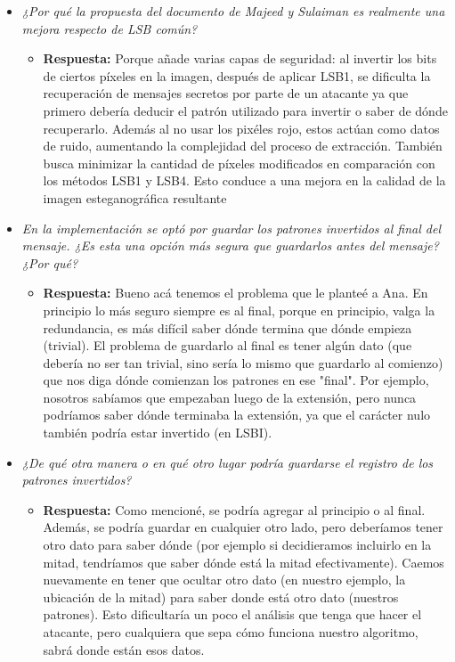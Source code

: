 \documentclass[a4paper,12pt]{article}
\begin{document}
\begin{itemize}
\begin{itemize}
		\end{itemize}
		
		
		\item \textit{¿Por qué la propuesta del documento de Majeed y Sulaiman es realmente una mejora respecto de LSB común?}
		\begin{itemize}
			\item \textbf{Respuesta:} Porque añade varias capas de seguridad: al invertir los bits de ciertos píxeles en la imagen, después de aplicar LSB1, se dificulta la recuperación de mensajes secretos por parte de un atacante ya que primero debería deducir el patrón utilizado para invertir o saber de dónde recuperarlo. Además al no usar los pixéles rojo, estos actúan como datos de ruido, aumentando la complejidad del proceso de extracción. También busca minimizar la cantidad de píxeles modificados en comparación con los métodos LSB1 y LSB4. Esto conduce a una mejora en la calidad de la imagen esteganográfica resultante
		\end{itemize}
		
		\item \textit{En la implementación se optó por guardar los patrones invertidos al final del mensaje. ¿Es esta una opción más segura que guardarlos antes del mensaje? ¿Por qué?}
		\begin{itemize}
			\item \textbf{Respuesta:} Bueno acá tenemos el problema que le planteé a Ana. En principio lo más seguro siempre es al final, porque en principio, valga la redundancia, es más difícil saber dónde termina que dónde empieza (trivial). El problema de guardarlo al final es tener algún dato (que debería no ser tan trivial, sino sería lo mismo que guardarlo al comienzo) que nos diga dónde comienzan los patrones en ese "final". Por ejemplo, nosotros sabíamos que empezaban luego de la extensión, pero nunca podríamos saber dónde terminaba la extensión, ya que el carácter nulo también podría estar invertido (en LSBI).
		\end{itemize}
		
		\item \textit{¿De qué otra manera o en qué otro lugar podría guardarse el registro de los patrones invertidos?}
		\begin{itemize}
			\item \textbf{Respuesta:} Como mencioné, se podría agregar al principio o al final. Además, se podría guardar en cualquier otro lado, pero deberíamos tener otro dato para saber dónde (por ejemplo si decidieramos incluirlo en la mitad, tendríamos que saber dónde está la mitad efectivamente). Caemos nuevamente en tener que ocultar otro dato (en nuestro ejemplo, la ubicación de la mitad) para saber donde está otro dato (nuestros patrones). Esto dificultaría un poco el análisis que tenga que hacer el atacante, pero cualquiera que sepa cómo funciona nuestro algoritmo, sabrá donde están esos datos.
		\end{itemize}
		

\end{itemize}
\end{document}
